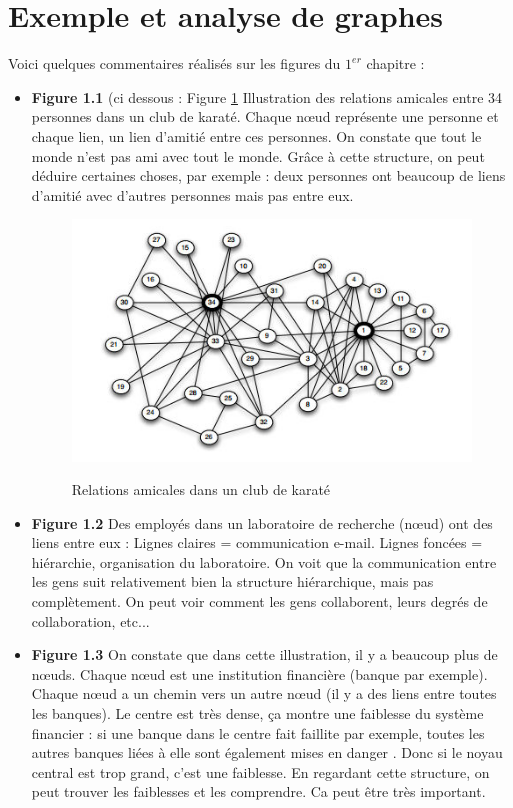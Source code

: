 \section{Exemple et analyse de graphes}
Voici quelques commentaires réalisés sur les figures du $1^{er}$ chapitre :
\begin{itemize}

	\item \textbf{Figure 1.1} (ci dessous : Figure \ref{karate} Illustration des relations amicales entre 34 personnes dans un club de karaté.
Chaque nœud représente une personne et chaque lien, un lien d'amitié entre ces personnes.
On constate que tout le monde n'est pas ami avec tout le monde. Grâce à cette structure, on peut déduire certaines choses, par exemple : deux personnes ont beaucoup de liens d'amitié avec d'autres personnes mais pas entre eux.\\
\begin{figure}[!h]
\centering
\includegraphics[scale=1]{images/17_karate_club.jpg}
\label{karate}
\caption{Relations amicales dans un club de karaté}
\end{figure}

	\item \textbf{Figure 1.2} Des employés dans un laboratoire de recherche (nœud) ont des liens entre eux :
Lignes claires = communication e-mail.
Lignes foncées = hiérarchie, organisation du laboratoire.
On voit que la communication entre les gens suit relativement bien la structure hiérarchique, mais pas complètement. On peut voir comment les gens collaborent, leurs degrés de collaboration, etc... \\

	\item \textbf{Figure 1.3} On constate que dans cette illustration, il y a beaucoup plus de nœuds. Chaque nœud est une institution financière (banque par exemple). Chaque nœud a un chemin vers un autre nœud (il y a des liens entre toutes les banques). Le centre est très dense, ça montre une faiblesse du système financier : si une banque dans le centre fait faillite par exemple, toutes les autres banques liées à elle sont également mises en danger . Donc si le noyau central est trop grand, c'est une faiblesse. En regardant cette structure, on peut trouver les faiblesses et les comprendre. Ca peut être très important.\\


\end{itemize}
